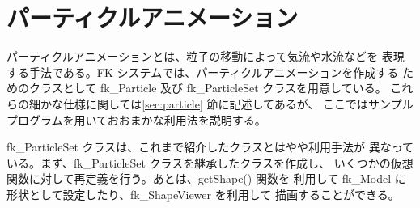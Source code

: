 \section{パーティクルアニメーション}
パーティクルアニメーションとは、粒子の移動によって気流や水流などを
表現する手法である。FK システムでは、パーティクルアニメーションを作成する
ためのクラスとして fk\_Particle 及び fk\_ParticleSet クラスを用意している。
これらの細かな仕様に関しては\ref{sec:particle} 節に記述してあるが、
ここではサンプルプログラムを用いておおまかな利用法を説明する。

fk\_ParticleSet クラスは、これまで紹介したクラスとはやや利用手法が
異なっている。まず、fk\_ParticleSet クラスを継承したクラスを作成し、
いくつかの仮想関数に対して再定義を行う。あとは、getShape() 関数を
利用して fk\_Model に形状として設定したり、fk\_ShapeViewer を利用して
描画することができる。

